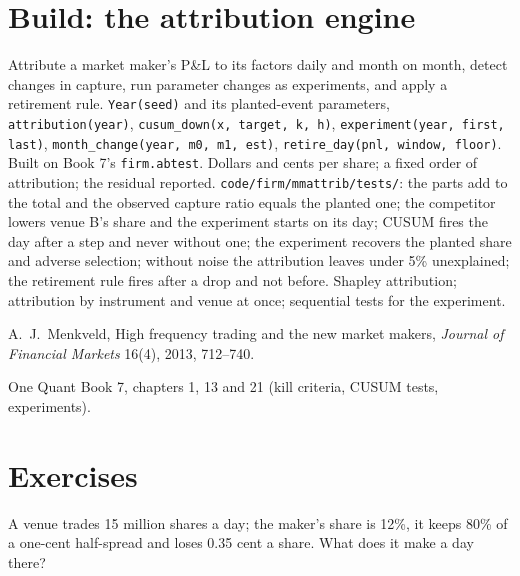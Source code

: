 \section{Build: the attribution engine}\label{bld:hf:pnl-analytics-and-the-strategy-lifecycle:mmattrib}

\begin{build}
 Attribute a market maker's P\&L to its factors daily and month on month, detect changes in capture, run parameter changes as
experiments, and apply a retirement rule.
 \texttt{Year(seed)} and its planted-event parameters, \texttt{attribution(year)}, \texttt{cusum\_down(x, target, k, h)}, \texttt{experiment(year, first,
last)}, \texttt{month\_change(year, m0, m1, est)}, \texttt{retire\_day(pnl, window, floor)}. Built on Book 7's \texttt{firm.abtest}.
 Dollars and cents per share; a fixed order of attribution; the residual reported.
 \texttt{code/firm/mmattrib/tests/}: the parts add to the total and the observed capture ratio equals the planted one; the
competitor lowers venue B's share and the experiment starts on its day; CUSUM fires the day after a step and never without one; the experiment
recovers the planted share and adverse selection; without noise the attribution leaves under 5\% unexplained; the retirement rule fires after a
drop and not before.
 Shapley attribution; attribution by instrument and venue at once; sequential tests for the experiment.
\end{build}

\begin{omsources}
\item A.~J.~Menkveld, High frequency trading and the new market makers, \emph{Journal of Financial Markets} 16(4), 2013, 712--740.
\item One Quant Book 7, chapters 1, 13 and 21 (kill criteria, CUSUM tests, experiments).
\end{omsources}

\section{Exercises}

\begin{exercise}[$\star$]\label{exo:hf:pnl-analytics-and-the-strategy-lifecycle:1}
A venue trades 15 million shares a day; the maker's share is 12\%, it keeps 80\% of a one-cent half-spread and loses 0.35 cent a share. What does it
make a day there?
\end{exercise}

